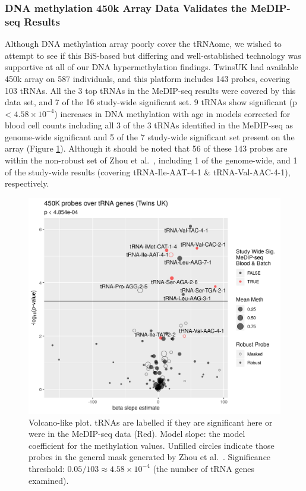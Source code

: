 \documentclass[]{book}
\begin{document}
\hypertarget{dna-methylation-450k-array-data-validates-the-medip-seq-results}{%
\subsubsection{DNA methylation 450k Array Data Validates the MeDIP-seq Results}\label{dna-methylation-450k-array-data-validates-the-medip-seq-results}}

Although DNA methylation array poorly cover the tRNAome, we wished to attempt to see if this BiS-based but differing and well-established technology was supportive at all of our DNA hypermethylation findings.
TwinsUK had available 450k array on 587 individuals, and this platform includes 143 probes, covering 103 tRNAs.
All the 3 top tRNAs in the MeDIP-seq results were covered by this data set, and 7 of the 16 study-wide significant set.
9 tRNAs show significant (p \textless{} \(4.58\times10^{-4}\)) increases in DNA methylation with age in models corrected for blood cell counts including all 3 of the 3 tRNAs identified in the MeDIP-seq as genome-wide significant and 5 of the 7 study-wide significant set present on the array (Figure \ref{fig:bloodEpitwins450kCounts}).
Although it should be noted that 56 of these 143 probes are within the non-robust set of Zhou et al.~\citep{Zhou2017}, including 1 of the genome-wide, and 1 of the study-wide results (covering tRNA-Ile-AAT-4-1 \& tRNA-Val-AAC-4-1), respectively.

\begin{figure}

{\centering \includegraphics[width=1\linewidth]{./figs/blood_epitwins450k_Counts_sws_bl_zhou} 

}

\caption{Volcano-like plot. tRNAs are labelled if they are significant here or were in the MeDIP-seq data (Red). Model slope: the model coefficient for the methylation values. Unfilled circles indicate those probes in the general mask generated by Zhou et al.~\citep{Zhou2017}. Significance threshold: \(0.05/103 \approx 4.58\times10^{-4}\) (the number of tRNA genes examined).}\label{fig:bloodEpitwins450kCounts}
\end{figure}
\end{document}
